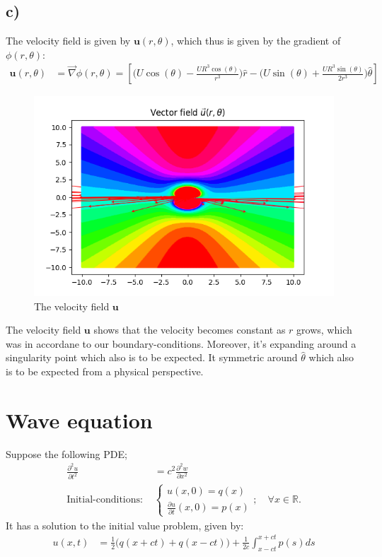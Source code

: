 \documentclass{article}
\begin{document}
\subsection*{c)}
The velocity field is given by $\mathbf{u}(r, \theta)$, which thus is given by the gradient of $\phi(r, \theta)$:
\begin{align*}
    \mathbf{u}(r, \theta) &= \vec{\nabla}\phi(r, \theta) =\left[\Big(U\cos(\theta) - \frac{UR^3\cos(\theta)}{r^3}\Big)\hat{r}-\Big(U\sin(\theta) +\frac{UR^3\sin(\theta)}{2r^3}\Big)\hat{\theta}\right]
\end{align*}
\begin{figure}[H]
    \centering
    \includegraphics[scale =0.5]{task2_3.png}
    \caption{The velocity field $\mathbf{u}$}
    \label{fig: 2.3}
\end{figure}\noindent
The velocity field $\mathbf{u}$ shows that the velocity becomes constant as $r$ grows, which was in accordane to our boundary-conditions. Moreover, it's expanding around a singularity point which also is to be expected. It symmetric around $\hat{\theta}$ which also is to be expected from a physical perspective.

\section*{Wave equation}
Suppose the following PDE;
\begin{align*}
    \frac{\partial^2u}{\partial t^2} &= c^2\frac{\partial^2w}{\partial x^2}\\
    \text{Initial-conditions: }&\begin{cases}
        u(x,0) = q(x)\\
        \frac{\partial u}{\partial t}(x,0) = p(x)
    \end{cases};\quad \forall x\in\mathbb{R}.
\end{align*}It has a solution to the initial value problem, given by:
\begin{align}
    u(x,t) &=\frac{1}{2}\Big(q(x+ct) + q(x - ct)\Big)+\frac{1}{2c}\int_{x - ct}^{x + ct}p(s)ds\label{eq 3.1}
\end{align}
\end{document}
